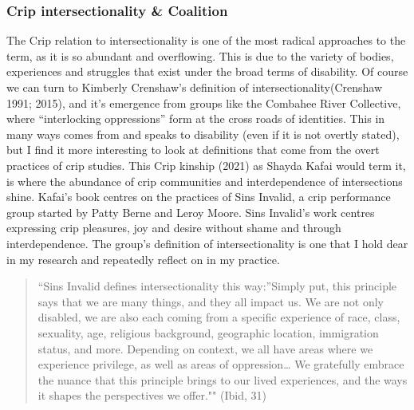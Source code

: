 \hypertarget{crip-intersectionality-coalition}{%
\subsubsection{Crip intersectionality \&
Coalition}\label{crip-intersectionality-coalition}}

The Crip relation to intersectionality is one of the most radical
approaches to the term, as it is so abundant and overflowing. This is
due to the variety of bodies, experiences and struggles that exist under
the broad terms of disability. Of course we can turn to Kimberly
Crenshaw's definition of intersectionality(Crenshaw 1991; 2015), and
it's emergence from groups like the Combahee River Collective, where
``interlocking oppressions'' form at the cross roads of identities. This
in many ways comes from and speaks to disability (even if it is not
overtly stated), but I find it more interesting to look at definitions
that come from the overt practices of crip studies. This Crip kinship
(2021) as Shayda Kafai would term it, is where the abundance of crip
communities and interdependence of intersections shine. Kafai's book
centres on the practices of Sins Invalid, a crip performance group
started by Patty Berne and Leroy Moore. Sins Invalid's work centres
expressing crip pleasures, joy and desire without shame and through
interdependence. The group's definition of intersectionality is one that
I hold dear in my research and repeatedly reflect on in my practice.

\begin{quote}
``Sins Invalid defines intersectionality this way:''Simply put, this
principle says that we are many things, and they all impact us. We are
not only disabled, we are also each coming from a specific experience of
race, class, sexuality, age, religious background, geographic location,
immigration status, and more. Depending on context, we all have areas
where we experience privilege, as well as areas of oppression\ldots{} We
gratefully embrace the nuance that this principle brings to our lived
experiences, and the ways it shapes the perspectives we offer."" (Ibid,
31)
\end{quote}

